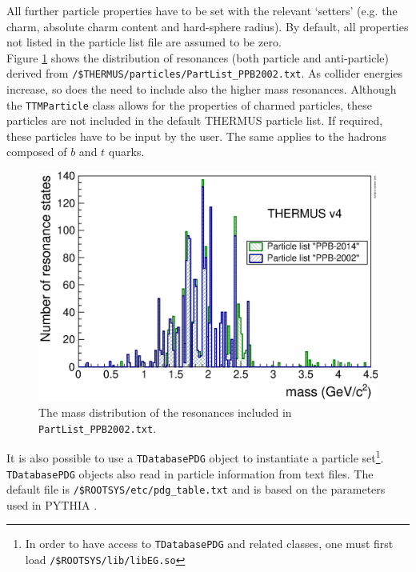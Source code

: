 \documentclass{elsarticle}
\begin{document}
All further particle properties have to be set with the relevant `setters' (e.g. the charm, absolute charm 
content and hard-sphere radius). By default, all properties not listed in the particle list 
file are assumed to be zero.\\
 
Figure \ref{ResDistr} shows the distribution of resonances (both particle and 
anti-particle) derived from \texttt{/\$THERMUS/particles/PartList\_PPB2002.txt}. 
As collider energies increase, so does the need to include also the higher mass 
resonances. Although the \texttt{TTMParticle} class allows for the 
properties of charmed particles, these particles are not included in the default THERMUS 
particle list. If required, these particles have to be input by the user. The same applies to 
the hadrons composed of $b$ and $t$ quarks.\\

\begin{figure}
\begin{center}
\includegraphics[width=12cm]{fig3_ResonanceMassDistribution_comp_Thermus_v4.eps}
\caption{The mass distribution 
of the resonances included in \texttt{PartList\_PPB2002.txt}.}\label{ResDistr}
\end{center}
\end{figure}

It is also possible to use a \texttt{TDatabasePDG} object to instantiate a particle set\footnote{In order 
to have access to \texttt{TDatabasePDG} and related classes, one must first load 
\texttt{/\$ROOTSYS/lib/libEG.so}}. \texttt{TDatabasePDG} objects also read in particle information from text 
files. The default file is \texttt{/\$ROOTSYS/etc/pdg\_table.txt} and is based on the parameters used in PYTHIA \cite{Sjostrand:2000wi}.\\
\end{document}
